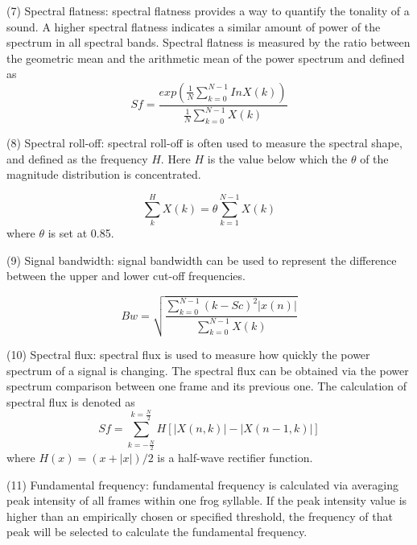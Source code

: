 \vspace{3mm}
\noindent(7) Spectral flatness: spectral flatness provides a way to quantify the tonality of a sound. A higher spectral flatness indicates a similar amount of power of the spectrum in all spectral bands. Spectral flatness is measured by the ratio between the geometric mean and the arithmetic mean of the power spectrum and defined as
\begin{equation}
Sf = \frac{exp(\frac{1}{N}\sum_{k=0}^{N-1}InX(k))}{\frac{1}{N}\sum_{k=0}^{N-1}X(k)}
\end{equation}

\vspace{3mm}

\noindent(8) Spectral roll-off: spectral roll-off is often used to measure the spectral shape, and defined as the frequency $H$. Here $H$ is the value below which the $\theta$ of the magnitude distribution is concentrated.

\begin{equation}
\sum_{k}^{H}X(k)=\theta \sum_{k=1}^{N-1}X(k)
\end{equation}
where $\theta$ is set at 0.85.

\vspace{3mm}

\noindent(9) Signal bandwidth: signal bandwidth can be used to represent the difference between the upper and lower cut-off frequencies.

\begin{equation}
Bw=\sqrt{\frac{\sum_{k=0}^{N-1}(k-Sc)^{2}|x(n)|}{\sum_{k=0}^{N-1}X(k)}}
\end{equation} 

\vspace{3mm}

\noindent(10) Spectral flux: spectral flux is used to measure how quickly the power spectrum of a signal is changing. The spectral flux can be obtained via the power spectrum comparison between one frame and its previous one. The calculation of spectral flux is denoted as
\begin{equation}
Sf = \sum_{k=-\frac{N}{2}}^{k=\frac{N}{2}}H[|X(n,k)|-|X(n-1,k)|]
\end{equation}
where $H(x)=(x+|x|)/2$ is a half-wave rectifier function.

\vspace{3mm}

\noindent(11) Fundamental frequency: fundamental frequency is calculated via averaging peak intensity of all frames within one frog syllable. If the peak intensity value is higher than an empirically chosen or specified threshold, the frequency of that peak will be selected to calculate the fundamental frequency.

